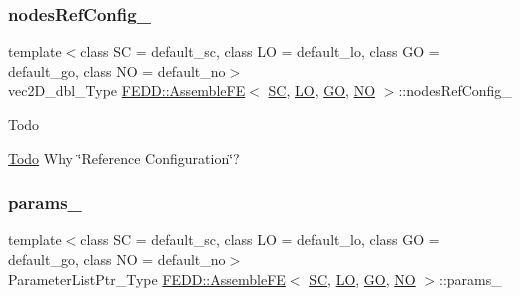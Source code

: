 \subsubsection{\texorpdfstring{nodes\+Ref\+Config\+\_\+}{nodesRefConfig\_}}
{\footnotesize\ttfamily template$<$class SC  = default\+\_\+sc, class LO  = default\+\_\+lo, class GO  = default\+\_\+go, class NO  = default\+\_\+no$>$ \\
vec2\+D\+\_\+dbl\+\_\+\+Type \hyperlink{classFEDD_1_1AssembleFE}{F\+E\+D\+D\+::\+Assemble\+FE}$<$ \hyperlink{fe__test__laplace_8cpp_a79c7e86a57edbb2a5a53242bcd04e41e}{SC}, \hyperlink{fe__test__laplace_8cpp_ad6a38c9f07d3fd633eefca5bccad8410}{LO}, \hyperlink{fe__test__laplace_8cpp_afa2946b509009b4f45eb04bd8c5b27d9}{GO}, \hyperlink{fe__test__laplace_8cpp_a5e24f37b28787429872b6ecb1d0417ce}{NO} $>$\+::nodes\+Ref\+Config\+\_\+\hspace{0.3cm}{\ttfamily [protected]}}

\begin{DoxyRefDesc}{Todo}
\item[\hyperlink{todo__todo000006}{Todo}]Why \char`\"{}\+Reference Configuration\char`\"{}? \end{DoxyRefDesc}
\mbox{\label{classFEDD_1_1AssembleFE_a1b7f9f820f3da30ff7dd8438ada14b3b}} 
\subsubsection{\texorpdfstring{params\+\_\+}{params\_}}
{\footnotesize\ttfamily template$<$class SC  = default\+\_\+sc, class LO  = default\+\_\+lo, class GO  = default\+\_\+go, class NO  = default\+\_\+no$>$ \\
Parameter\+List\+Ptr\+\_\+\+Type \hyperlink{classFEDD_1_1AssembleFE}{F\+E\+D\+D\+::\+Assemble\+FE}$<$ \hyperlink{fe__test__laplace_8cpp_a79c7e86a57edbb2a5a53242bcd04e41e}{SC}, \hyperlink{fe__test__laplace_8cpp_ad6a38c9f07d3fd633eefca5bccad8410}{LO}, \hyperlink{fe__test__laplace_8cpp_afa2946b509009b4f45eb04bd8c5b27d9}{GO}, \hyperlink{fe__test__laplace_8cpp_a5e24f37b28787429872b6ecb1d0417ce}{NO} $>$\+::params\+\_\+\hspace{0.3cm}{\ttfamily [protected]}}

\mbox{\label{classFEDD_1_1AssembleFE_ac270e80971846b789e7cb2507fe345ba}} 
